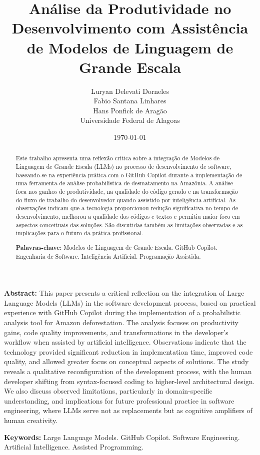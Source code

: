 \documentclass[12pt,a4paper]{article}
\title{\textbf{Análise da Produtividade no Desenvolvimento com Assistência de Modelos de Linguagem de Grande Escala}}
\author{Luryan Delevati Dorneles \\ Fabio Santana Linhares \\ Hans Ponfick de Aragão \\ \small{Universidade Federal de Alagoas}}
\date{\today}
\begin{document}
\maketitle

\begin{abstract}
Este trabalho apresenta uma reflexão crítica sobre a integração de Modelos de Linguagem de Grande Escala (LLMs) no processo de desenvolvimento de software, baseando-se na experiência prática com o GitHub Copilot durante a implementação de uma ferramenta de análise probabilística de desmatamento na Amazônia. A análise foca nos ganhos de produtividade, na qualidade do código gerado e na transformação do fluxo de trabalho do desenvolvedor quando assistido por inteligência artificial. As observações indicam que a tecnologia proporcionou redução significativa no tempo de desenvolvimento, melhorou a qualidade dos códigos e textos e permitiu maior foco em aspectos conceituais das soluções. São discutidas também as limitações observadas e as implicações para o futuro da prática profissional.

\bigskip
\noindent
\textbf{Palavras-chave:} Modelos de Linguagem de Grande Escala. GitHub Copilot. Engenharia de Software. Inteligência Artificial. Programação Assistida.
\end{abstract}

\bigskip

\bigskip

\noindent\textbf{Abstract:} 
This paper presents a critical reflection on the integration of Large Language Models (LLMs) in the software development process, based on practical experience with GitHub Copilot during the implementation of a probabilistic analysis tool for Amazon deforestation. The analysis focuses on productivity gains, code quality improvements, and transformations in the developer's workflow when assisted by artificial intelligence. Observations indicate that the technology provided significant reduction in implementation time, improved code quality, and allowed greater focus on conceptual aspects of solutions. The study reveals a qualitative reconfiguration of the development process, with the human developer shifting from syntax-focused coding to higher-level architectural design. We also discuss observed limitations, particularly in domain-specific understanding, and implications for future professional practice in software engineering, where LLMs serve not as replacements but as cognitive amplifiers of human creativity.

\noindent
\textbf{Keywords:} Large Language Models. GitHub Copilot. Software Engineering. Artificial Intelligence. Assisted Programming.
\end{document}
